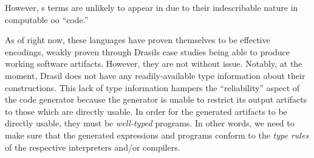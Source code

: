 However, \ModelExpr{}s terms are unlikely to appear in \CodeExpr{} due to their
indescribable nature in computable \acs{oo} ``code.''

As of right now, these languages have proven themselves to be effective
encodings, weakly proven through Drasils case studies being able to produce
working software artifacts. However, they are not without issue. Notably, at the
moment, Drasil does not have any readily-available type information about their
constructions. This lack of type information hampers the ``reliability'' aspect
of the code generator because the generator is unable to restrict its output
artifacts to those which are directly usable. In order for the generated
artifacts to be directly usable, they must be \textit{well-typed} programs. In
other words, we need to make sure that the generated expressions and programs
conform to the \textit{type rules} of the respective interpreters and/or
compilers.

